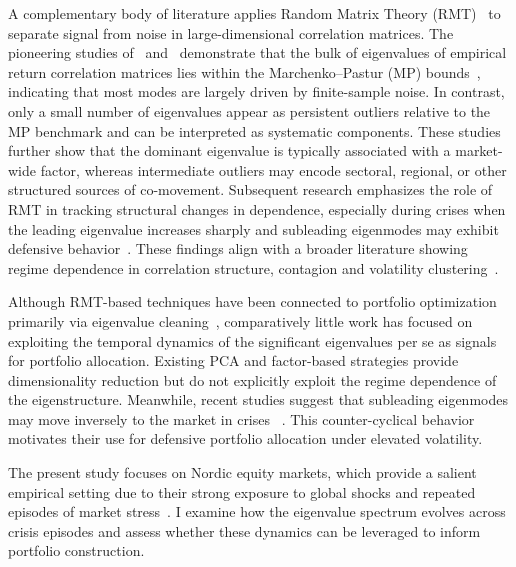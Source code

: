 \documentclass[pdflatex,sn-basic]{sn-jnl}%
\theoremstyle{thmstyleone}%
\theoremstyle{thmstyletwo}%
\theoremstyle{thmstylethree}%
\begin{document}
A complementary body of literature applies Random Matrix Theory (RMT)~\citep[see, e.g.,][]{bouchaud2003theory} 
to separate signal from noise in large-dimensional correlation matrices. The pioneering
studies of~\citet{laloux1999noise} and~\citet{plerou2002random} demonstrate that 
the bulk of eigenvalues of empirical return correlation matrices lies within the 
Marchenko--Pastur (MP) bounds~\citep{marchenko1967distribution}, indicating that 
most modes are largely driven by finite-sample noise. In contrast, only a small 
number of eigenvalues appear as persistent outliers relative to the MP benchmark 
and can be interpreted as systematic components. These studies further show that 
the dominant eigenvalue is typically associated with a market-wide factor, whereas 
intermediate outliers may encode sectoral, regional, or other structured sources of co-movement. 
Subsequent research emphasizes the role of RMT in tracking structural changes in dependence, 
especially during crises when the leading eigenvalue increases sharply and subleading 
eigenmodes may exhibit defensive behavior~\citep{james2022financial,molero2025random,dominguez2025correlation}. 
These findings align with a broader literature showing regime dependence in correlation structure,
contagion and volatility clustering~\citep{ang2002international, forbes2002no, cont2001empirical}.

Although RMT-based techniques have been connected to portfolio optimization primarily 
via eigenvalue cleaning~\citep{laloux1999noise, sharifi2004random}, comparatively 
little work has focused on exploiting the temporal dynamics of the significant 
eigenvalues per se as signals for portfolio allocation. Existing PCA and factor-based strategies
\citep{connor1986performance,fan2013large} provide dimensionality reduction but
do not explicitly exploit the regime dependence of the eigenstructure. Meanwhile, 
recent studies suggest that subleading eigenmodes may move inversely to the market 
in crises ~\citep{nobi2013random,molero2025random}. This counter-cyclical behavior motivates 
their use for defensive portfolio allocation under elevated volatility.

The present study focuses on Nordic equity markets, which provide a salient empirical
setting due to their strong exposure to global shocks and repeated episodes of
market stress~\citep{imf2013nordic, farelius2025financial}. I examine how the 
eigenvalue spectrum evolves across crisis episodes and assess whether these dynamics 
can be leveraged to inform portfolio construction.
\end{document}
